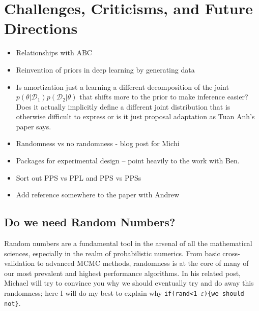 
\chapter{Challenges, Criticisms, and Future Directions}
\label{chp:discussion}

\begin{itemize}
	\item Relationships with ABC
	\item Reinvention of priors in deep learning by generating data
	\item Is amortization just a learning a different decomposition of the joint 
	$p(\theta | \mathcal{D}_1)p(\mathcal{D}_2|\theta)$ that shifts more to the
	prior to make inference easier?  Does it actually implicitly define a different
	joint distribution that is otherwise difficult to express or is it just proposal
	adaptation as Tuan Anh's paper says.
	\item Randomness vs no randomness - blog post for Michi
	\item Packages for experimental design -- point heavily to the work with Ben.
	\item Sort out PPS vs PPL and PPS vs PPSs
	\item Add reference somewhere to the paper with Andrew
\end{itemize}

\section{Do we need Random Numbers?}
	
Random numbers are a fundamental tool in the arsenal of all the mathematical sciences, especially in the realm of 
probabilistic numerics.  From basic cross-validation to advanced MCMC methods, randomness is at the core of 
many of our most prevalent and highest performance algorithms.  In his related post, Michael will 
try to convince you why we should eventually try and do away this randomness; here I will do my best to explain why
\texttt{if(rand<1-$\varepsilon$)\{we should not\}}.

